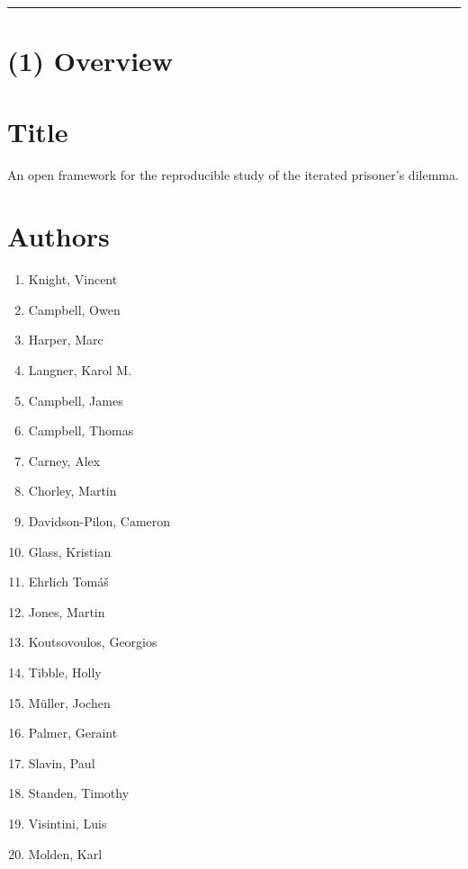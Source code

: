 \documentclass{jors}
\renewcommand\headrule{}
\begin{document}
\pagestyle{fancy}
\renewcommand\headrule{}
\rhead{\textcolor{gray}{UP JORS software Latex paper template version 0.1}}

\rule{\textwidth}{1pt}

\section*{(1) Overview}\label{sec:sec:overview}

\vspace{0.5cm}

\section*{Title}

An open framework for the reproducible study of the iterated prisoner's
dilemma.

\section*{Authors}

\begin{multicols}{2}
    \begin{enumerate}[noitemsep,topsep=0pt]
        \item Knight, Vincent
        \item Campbell, Owen
        \item Harper, Marc
        \item Langner, Karol M.
        \item Campbell, James
        \item Campbell, Thomas
        \item Carney, Alex
        \item Chorley, Martin
        \item Davidson-Pilon, Cameron
        \item Glass, Kristian
        \item Ehrlich Tom{\'a}{\v s}
        \item Jones, Martin
        \item Koutsovoulos, Georgios
        \item Tibble, Holly
        \item M{\"u}ller, Jochen
        \item Palmer, Geraint
        \item Slavin, Paul
        \item Standen, Timothy
        \item Visintini, Luis
        \item Molden, Karl
    \end{enumerate}
\end{multicols}
\end{document}

